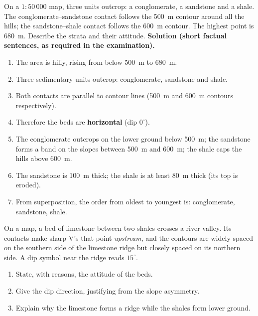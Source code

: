 \documentclass[11pt]{article}
\begin{document}
\begin{exoresolu}
On a $1:50\,000$ map, three units outcrop: a conglomerate, a sandstone and a shale. The conglomerate--sandstone contact follows the \SI{500}{m} contour around all the hills; the sandstone--shale contact follows the \SI{600}{m} contour. The highest point is \SI{680}{m}. Describe the strata and their attitude.
\tcblower
\textbf{Solution (short factual sentences, as required in the examination).}
\begin{enumerate}
\item The area is hilly, rising from below \SI{500}{m} to \SI{680}{m}.
\item Three sedimentary units outcrop: conglomerate, sandstone and shale.
\item Both contacts are parallel to contour lines (\SI{500}{m} and \SI{600}{m} contours respectively).
\item Therefore the beds are \textbf{horizontal} (dip $0^\circ$).
\item The conglomerate outcrops on the lower ground below \SI{500}{m}; the sandstone forms a band on the slopes between \SI{500}{m} and \SI{600}{m}; the shale caps the hills above \SI{600}{m}.
\item The sandstone is \SI{100}{m} thick; the shale is at least \SI{80}{m} thick (its top is eroded).
\item From superposition, the order from oldest to youngest is: conglomerate, sandstone, shale.
\end{enumerate}
\end{exoresolu}

\begin{exercice}
On a map, a bed of limestone between two shales crosses a river valley. Its contacts make sharp V's that point \emph{upstream}, and the contours are widely spaced on the southern side of the limestone ridge but closely spaced on its northern side. A dip symbol near the ridge reads $15^\circ$.
\begin{enumerate}
\item State, with reasons, the attitude of the beds.
\item Give the dip direction, justifying from the slope asymmetry.
\item Explain why the limestone forms a ridge while the shales form lower ground.
\end{enumerate}
\end{exercice}
\end{document}
